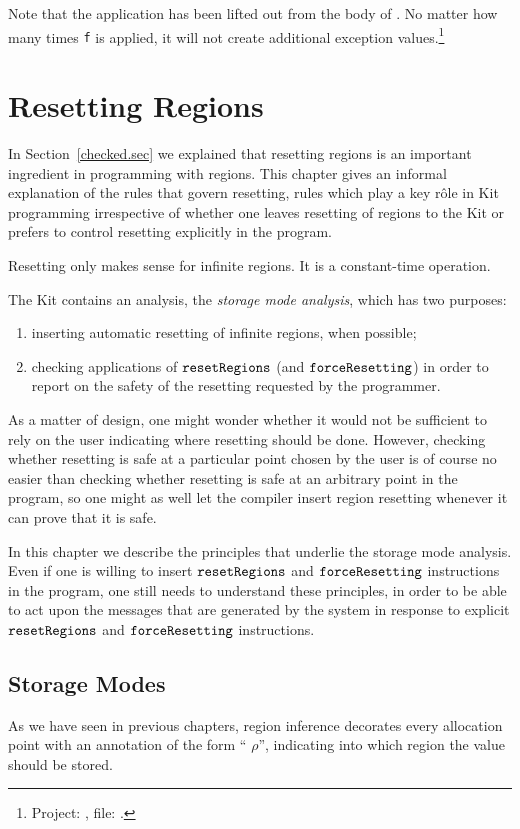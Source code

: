 \documentclass[12pt]{book}
\begin{document}
Note that the application
 has been lifted out from the 
body of . No matter how many times {\tt f} is applied,
it will not create additional exception values.\footnote{Project:
, file: .}
\chapter{Resetting Regions}
\label{storagemodes.sec}
In Section~\ref{checked.sec} we explained that resetting 
regions is an important ingredient in programming with regions.
This chapter gives an informal explanation of the rules that
govern resetting, rules which play a key r\^ole in Kit programming
irrespective of whether one leaves resetting of regions to the
Kit or prefers to control resetting explicitly in the program.


Resetting only makes sense for infinite regions. It is a 
constant-time operation.

The Kit contains an analysis, the {\em storage mode analysis}, which has
two purposes:
\begin{enumerate}
\item inserting automatic resetting of infinite regions, when possible;
\item checking applications of $\hbox{\tt resetRegions}$ (and $\hbox{\tt forceResetting}$) in order to 
report on the safety of the resetting requested by the programmer.
\end{enumerate}

As a matter of design, one might wonder whether it would not be sufficient
to rely on the user indicating where resetting should be done. However,
checking whether resetting is safe at a particular point chosen
by the user is of course no easier than checking whether resetting is safe
at an arbitrary point in the program, so one might as well let the compiler
insert region resetting whenever it can prove that it is safe. 

In this chapter we describe the principles that underlie the storage
mode analysis. Even if one is willing to insert $\hbox{\tt resetRegions}$ and
$\hbox{\tt forceResetting}$ instructions in the program, one still needs to understand
these principles, in order to be able to act upon the messages that are
generated by the system in response to explicit $\hbox{\tt resetRegions}$ and
$\hbox{\tt forceResetting}$ instructions.
%
\section{Storage Modes}
%
As we have seen in previous chapters, region inference decorates every 
allocation point with an annotation of the 
form `` $\rho$'',
indicating into which region the value should be stored. 
\end{document}
